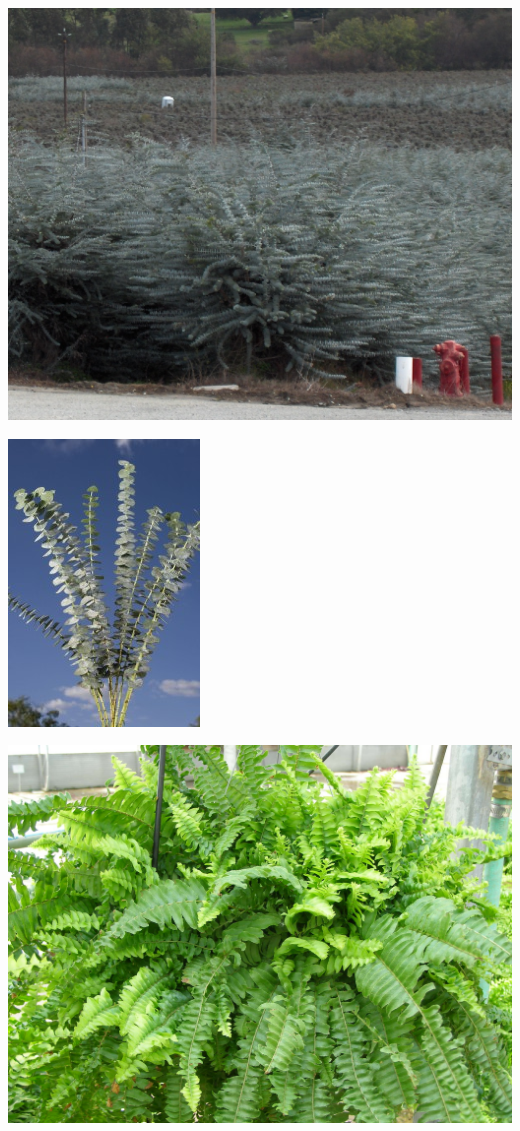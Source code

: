 \documentclass{article}
\begin{document}
\begin{center}
\includegraphics[width=0.9\textheight, angle=90]{../Eucalyptus_Field.jpg}
\end{center}
\newpage

\begin{center}
\includegraphics[width=0.9\textheight, angle=90]{../Euclyptus.jpg}
\end{center}
\newpage

\begin{center}
\includegraphics[width=0.9\textheight, angle=90]{../Fern_Boston.jpg}
\end{center}
\newpage
\end{document}
